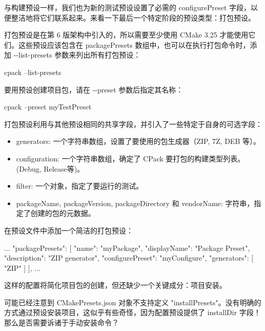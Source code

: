 与构建预设一样，我们也为新的测试预设设置了必需的 configurePreset 字段，以便整洁地将它们联系起来。来看一下最后一个特定阶段的预设类型：打包预设。


打包预设是在第 6 版架构中引入的，所以需要至少使用 CMake 3.25 才能使用它们。这些预设应该包含在 packagePresets 数组中，也可以在执行打包命令时，添加 -{}-list-presets 参数来列出所有打包预设：

\begin{shell}
cpack --list-presets
\end{shell}

要用预设创建项目包，请在 -{}-preset 参数后指定其名称：

\begin{shell}
cpack --preset myTestPreset
\end{shell}

打包预设利用与其他预设相同的共享字段，并引入了一些特定于自身的可选字段：

\begin{itemize}
\item
generators: 一个字符串数组，设置了要使用的包生成器（ZIP, 7Z, DEB 等）。

\item
configuration: 一个字符串数组，确定了 CPack 要打包的构建类型列表。 (Debug, Release等)。

\item
filter:  一个对象，指定了要运行的测试。

\item
packageName, packageVersion, packageDirectory 和 vendorName: 字符串，指定了创建的包的元数据。
\end{itemize}

在预设文件中添加一个简洁的打包预设：


\begin{json}
...
    "packagePresets": [
        {
            "name": "myPackage",
            "displayName": "Package Preset",
            "description": "ZIP generator",
            "configurePreset": "myConfigure",
            "generators": [
            "ZIP"
            ]
        }
    ],
...
\end{json}

这样的配置将简化项目包的创建，但还缺少一个关键成分：项目安装。


可能已经注意到 CMakePresets.json 对象不支持定义 "installPresets"。没有明确的方式通过预设安装项目，这似乎有些奇怪，因为配置预设提供了 installDir 字段！那么是否需要诉诸于手动安装命令？


